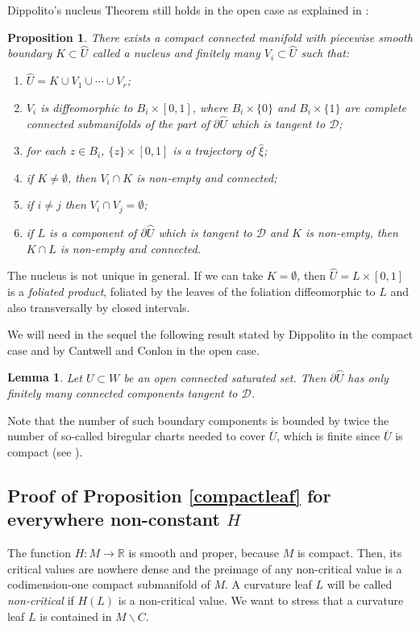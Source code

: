 \documentclass[10pt]{amsart}
\let\mathcal\mathscr
\let\moins\smallsetminus
\newtheorem{lemma}[theorem]{Lemma}
\newtheorem{proposition}[theorem]{Proposition}
\theoremstyle{definition}
\theoremstyle{remark}
\numberwithin{equation}{section}
\newcommand{\RR}{\mathbb R}
\begin{document}
Dippolito's nucleus Theorem still holds in the open case as explained in \cite[\S4]{CaC}:
\begin{proposition}
There exists a
compact connected manifold with piecewise smooth boundary $K\subset \wideparen{U}$ called a \emph{nucleus}
and finitely many $V_i\subset \wideparen{U}$ such that:
\begin{enumerate}
\item $\wideparen{U}=K\cup V_1\cup\cdots\cup V_r$;
\item $V_i$ is diffeomorphic to $B_i\times [0,1]$, where $B_i\times\{0\}$ and
$B_i\times\{1\}$ are complete connected submanifolds of the part of $\partial \wideparen{U}$ which is tangent to $\mathcal D$;
\item for each $z\in B_i$, $\{z\}\times [0,1]$ is a trajectory of $\widehat{\xi}$;
\item if $K\neq\emptyset$, then $V_i\cap K$ is non-empty and connected;
\item if $i\neq j$ then $V_i\cap V_j=\emptyset$;
\item if $L$ is a component of $\partial\wideparen U$ which is tangent to $\mathcal D$ and $K$ is non-empty,
then $K\cap L$ is non-empty and connected.
\end{enumerate}
\end{proposition}
The nucleus is not unique in general. If we can take $K=\emptyset$, then $\wideparen{U}=L\times [0,1]$ is a
\emph{foliated product}, foliated by the leaves of the foliation diffeomorphic to $L$ and also transversally by closed intervals.

We will need in the sequel the following result stated by Dippolito \cite[Prop.\,2]{Dip} in the compact case and by Cantwell and Conlon \cite[Lem.\,4.2]{CaC} in the open case.
\begin{lemma}\label{finiteborder}
Let $U\subset W$ be an open connected saturated set.
Then $\partial \wideparen{U}$ has only finitely many connected components tangent to $\mathcal D$.
\end{lemma}
Note that the number of such boundary components is bounded by twice the number of
so-called biregular charts needed to cover $\overline{U}$, which is finite since $\overline{U}$ is compact (see \cite{Dip}).

\subsection{Proof of Proposition \ref{compactleaf} for everywhere non-constant $H$}\label{sect:noncritical}
The function $H:M\to \RR$ is smooth and proper, because $M$ is compact.
Then, its critical values are nowhere dense and the preimage
of any non-critical value is a codimension-one compact
submanifold of $M$. A curvature leaf $L$
will be called \emph{non-critical} if $H(L)$ is a non-critical value.
We want to stress that a curvature leaf $L$ is contained in $M\moins C$.
\end{document}
